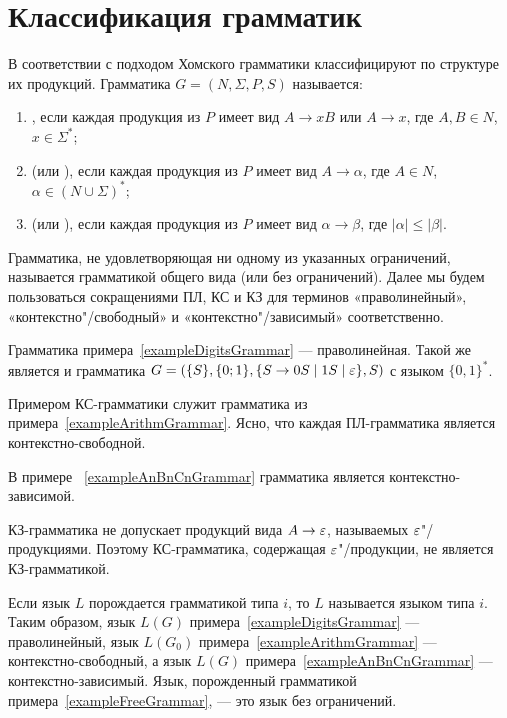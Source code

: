 \section{Классификация грамматик}
\label{Chapter1GrammarsClasses}

В соответствии с подходом Хомского грамматики классифицируют по структуре их продукций. Грамматика $G=(N,\Sigma,P,S)$ называется:
\begin{enumerate}
    \item {}, если каждая продукция из $P$
    имеет вид
    $A \to xB$ или $A \to x$, где $A,B \in N$, $x\in\Sigma^*$;

    \item {} (или ),
    если каждая продукция из
    $P$ имеет вид $A \to \alpha$, где $A \in N$,
    $\alpha\in(N\cup\Sigma)^*$;

    \item {} (или ),
    если каждая продукция из $P$ имеет вид
    $\alpha\to\beta$, где $|\alpha| \le |\beta|$.
\end{enumerate}

Грамматика, не удовлетворяющая ни одному из указанных ограничений,
называется грамматикой общего вида (или без ограничений). Далее мы
будем пользоваться сокращениями ПЛ, КС и КЗ для терминов
«праволинейный», «кон\-текс\-тно"/свободный» и «контекстно"/зависимый»
соответственно.

Грамматика примера~\ref{exampleDigitsGrammar} --- праволинейная. Такой же является и грамматика $G=(\{S\},\{0;1\},\{S\to0S\mid1S\mid\varepsilon\},S)$ с языком $\{0,1\}^*$.

Примером КС-грамматики служит грамматика из примера~\ref{exampleArithmGrammar}. Ясно, что
каждая ПЛ-грамматика является контекстно-свободной.

В примере ~\ref{exampleAnBnCnGrammar} грамматика является контекстно-зависимой.

КЗ-грамматика не допускает продукций вида $A\to\varepsilon$, называемых
$\varepsilon$"/продукциями. Поэтому КС-грамматика, содержащая
$\varepsilon$"/продукции, не является КЗ-грамматикой.

Если язык $L$ порождается грамматикой типа $i$, то $L$ называется
языком типа $i$. Таким образом, язык $L(G)$ примера~\ref{exampleDigitsGrammar} ---
праволинейный, язык $L(G_0)$ примера~\ref{exampleArithmGrammar} --- контекстно-свободный, а
язык $L(G)$ примера~\ref{exampleAnBnCnGrammar} --- контекстно-зависимый. Язык, порожденный
грамматикой примера~\ref{exampleFreeGrammar}, --- это язык без ограничений.

